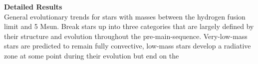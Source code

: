 \textbf{Detailed Results} \\
General evolutionary trends for stars with masses between the hydrogen fusion limit and 5 Msun. Break stars up into three categories that are largely defined by their structure and evolution throughout the pre-main-sequence. Very-low-mass stars are predicted to remain fully convective, low-mass stars develop a radiative zone at some point during their evolution but end on the 